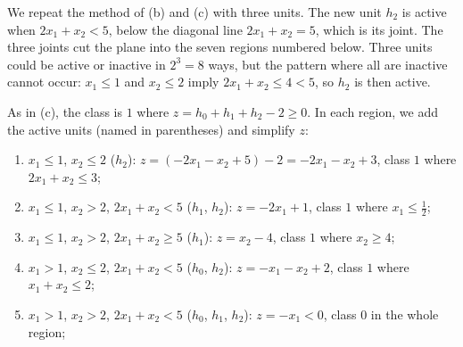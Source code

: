 \documentclass[11pt, a4paper]{exam}
\begin{document}
\begin{exercises}
\begin{parts}
    \begin{solution}
        We repeat the method of (b) and (c) with three units. The new unit $h_2$ is active when $2x_1 + x_2 < 5$, below the diagonal line $2x_1 + x_2 = 5$, which is its joint. The three joints cut the plane into the seven regions numbered below. Three units could be active or inactive in $2^3 = 8$ ways, but the pattern where all are inactive cannot occur: $x_1 \leq 1$ and $x_2 \leq 2$ imply $2x_1 + x_2 \leq 4 < 5$, so $h_2$ is then active.
        \begin{center}
        \end{center}
        As in (c), the class is $1$ where $z = h_0 + h_1 + h_2 - 2 \geq 0$. In each region, we add the active units (named in parentheses) and simplify $z$:
        \begin{enumerate}
            \item $x_1 \leq 1$, $x_2 \leq 2$ ($h_2$): $z = (-2x_1 - x_2 + 5) - 2 = -2x_1 - x_2 + 3$, class $1$ where $2x_1 + x_2 \leq 3$;
            \item $x_1 \leq 1$, $x_2 > 2$, $2x_1 + x_2 < 5$ ($h_1$, $h_2$): $z = -2x_1 + 1$, class $1$ where $x_1 \leq \frac{1}{2}$;
            \item $x_1 \leq 1$, $x_2 > 2$, $2x_1 + x_2 \geq 5$ ($h_1$): $z = x_2 - 4$, class $1$ where $x_2 \geq 4$;
            \item $x_1 > 1$, $x_2 \leq 2$, $2x_1 + x_2 < 5$ ($h_0$, $h_2$): $z = -x_1 - x_2 + 2$, class $1$ where $x_1 + x_2 \leq 2$;
            \item $x_1 > 1$, $x_2 > 2$, $2x_1 + x_2 < 5$ ($h_0$, $h_1$, $h_2$): $z = -x_1 < 0$, class $0$ in the whole region;

\end{enumerate}
\end{solution}
\end{parts}
\end{exercises}
\end{document}
